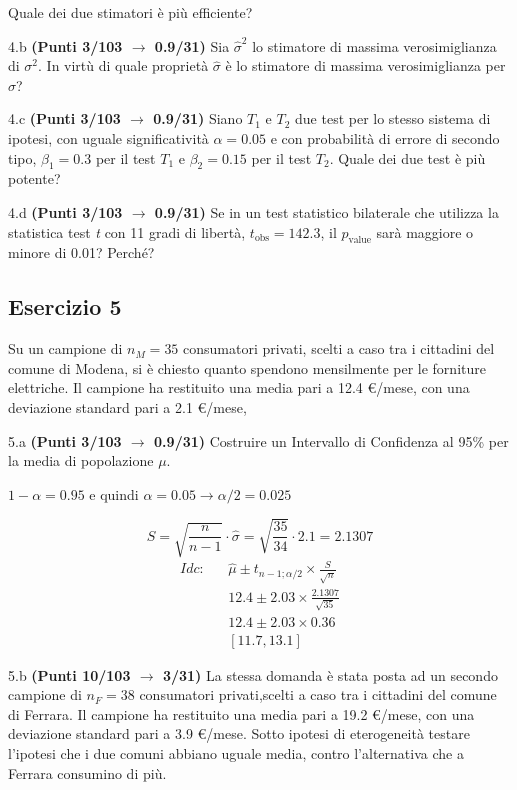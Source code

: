 \documentclass[
  11pt,
]{book}
\theoremstyle{mytheoremstyle}
\theoremstyle{mydefstyle}
\newenvironment{sol}
  {
  \begin{tcolorbox}[enhanced,breakable,arc=0.1mm,boxrule=1pt,colback=white,colframe=iblue,
  title=\bf \fontfamily{lmss}\selectfont \hspace{.5 cm} Soluzione,drop fuzzy shadow]

}{
\end{tcolorbox}
  }
\begin{document}
Quale dei due stimatori è più efficiente?

4.b \textbf{(Punti 3/103 \(\rightarrow\) 0.9/31)} Sia \(\hat\sigma^2\) lo stimatore di massima verosimiglianza
di \(\sigma^2\). In virtù di quale proprietà \(\hat \sigma\) è lo stimatore di
massima verosimiglianza per \(\sigma\)?

4.c \textbf{(Punti 3/103 \(\rightarrow\) 0.9/31)} Siano \(T_1\) e \(T_2\) due test per lo stesso sistema di ipotesi,
con uguale significatività \(\alpha=0.05\) e con probabilità di errore di secondo tipo, \(\beta_1=0.3\)
per il test \(T_1\) e \(\beta_2=0.15\) per il test \(T_2\). Quale dei due test è più potente?

4.d \textbf{(Punti 3/103 \(\rightarrow\) 0.9/31)} Se in un test statistico bilaterale che utilizza
la statistica test \emph{t} con 11 gradi di libertà, \(t_\text{obs}=142.3\),
il \(p_\text{value}\) sarà maggiore o minore di 0.01? Perché?

\subsection{Esercizio 5}\label{esercizio-5-15}

Su un campione di \(n_M=35\) consumatori privati, scelti a caso tra i cittadini del comune di Modena,
si è chiesto quanto spendono mensilmente per le forniture elettriche.
Il campione ha restituito una media pari a 12.4 €/mese, con una deviazione standard pari a 2.1 €/mese,

5.a \textbf{(Punti 3/103 \(\rightarrow\) 0.9/31)} Costruire un Intervallo di Confidenza al 95\% per la media di popolazione \(\mu\).

\begin{sol}
\(1-\alpha =0.95\) e quindi \(\alpha=0.05\rightarrow \alpha/2=0.025\)

\[
      S  =\sqrt{\frac {n}{n-1}}\cdot\hat\sigma =
     \sqrt{\frac { 35 }{ 34 }}\cdot 2.1 = 2.1307 
\]
\begin{eqnarray*}
  Idc: & &  \hat\mu \pm  t_{n-1;\alpha/2} \times \frac{S}{\sqrt{n}} \\
     & &  12.4 \pm  2.03 \times \frac{ 2.1307 }{\sqrt{ 35 }} \\
     & &  12.4 \pm  2.03 \times  0.36 \\
     & & [ 11.7 ,  13.1 ]
\end{eqnarray*}

\end{sol}

5.b \textbf{(Punti 10/103 \(\rightarrow\) 3/31)} La stessa domanda è stata posta ad un secondo campione di \(n_F=38\) consumatori privati,scelti a caso tra i cittadini del comune di Ferrara.
Il campione ha restituito una media pari a 19.2 €/mese, con una deviazione standard pari a 3.9 €/mese. Sotto ipotesi di eterogeneità testare l'ipotesi che i due comuni abbiano uguale media, contro l'alternativa che a Ferrara consumino di più.
\end{document}
